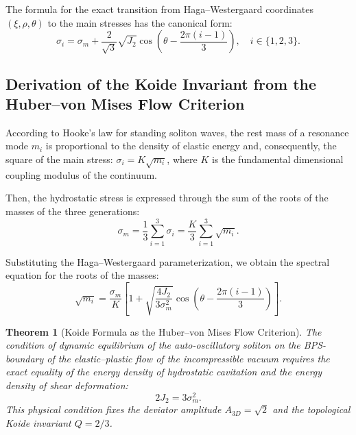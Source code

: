 \documentclass[12pt,a4paper]{article}
\newtheorem{theorem}{Theorem}
\begin{document}
	The formula for the exact transition from Haga--Westergaard coordinates $(\xi, \rho, \theta)$ to the main stresses has the canonical form:
	\begin{equation}
	\sigma_i = \sigma_m + \frac{2}{\sqrt{3}} \sqrt{J_2} \cos\left( \theta - \frac{2\pi(i-1)}{3} \right), \quad i \in \{1, 2, 3\}.
	\end{equation}
	
	\subsection{Derivation of the Koide Invariant from the Huber--von Mises Flow Criterion}
	According to Hooke's law for standing soliton waves, the rest mass of a resonance mode $m_i$ is proportional to the density of elastic energy and, consequently, the square of the main stress: $\sigma_i = K \sqrt{m_i}$, where $K$ is the fundamental dimensional coupling modulus of the continuum.
	
	Then, the hydrostatic stress is expressed through the sum of the roots of the masses of the three generations:
	\begin{equation}
	\sigma_m = \frac{1}{3} \sum_{i=1}^3 \sigma_i = \frac{K}{3} \sum_{i=1}^3 \sqrt{m_i}.
	\end{equation}
	
	Substituting the Haga--Westergaard parameterization, we obtain the spectral equation for the roots of the masses:
	\begin{equation}
	\sqrt{m_i} = \frac{\sigma_m}{K} \left[ 1 + \sqrt{\frac{4 J_2}{3 \sigma_m^2}} \cos\left( \theta - \frac{2\pi(i-1)}{3} \right) \right].
	\end{equation}
	
	\begin{theorem}[Koide Formula as the Huber--von Mises Flow Criterion]
	The condition of dynamic equilibrium of the auto-oscillatory soliton on the BPS-boundary of the elastic--plastic flow of the incompressible vacuum requires the exact equality of the energy density of hydrostatic cavitation and the energy density of shear deformation:
	\begin{equation}
	2 J_2 = 3 \sigma_m^2.
	\end{equation}
	This physical condition fixes the deviator amplitude $A_{3D} = \sqrt{2}$ and the topological Koide invariant $Q = 2/3$.
	\end{theorem}
	
\end{document}
